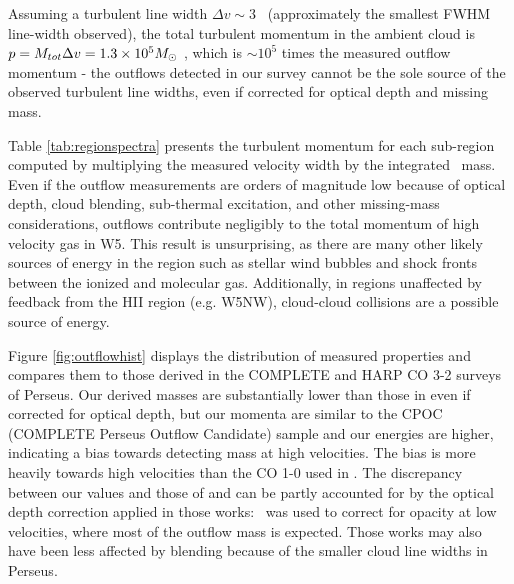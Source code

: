Assuming a turbulent line width $\Delta v \sim 3$ \kms\ (approximately the
smallest FWHM line-width observed), the total turbulent momentum in the ambient
cloud is $p = M_{tot} \Delta v = 1.3\times10^{5} M_{\odot}$ \kms, which is $\sim10^5$
times the measured outflow momentum - the outflows detected in our
survey cannot be the sole source of the observed turbulent line widths, even if
corrected for optical depth and missing mass.  

Table \ref{tab:regionspectra} presents the turbulent momentum for each
sub-region computed by multiplying the measured velocity width by the
integrated \thirteenco\ mass.  Even if the outflow measurements are 
orders of magnitude low because of optical depth, cloud blending, sub-thermal
excitation, and other missing-mass considerations, outflows contribute
negligibly to the total momentum of high velocity gas in W5.  This result is
unsurprising, as there are many other likely sources of energy in the region
such as stellar wind bubbles and shock fronts between the ionized and molecular
gas.  Additionally, in regions unaffected by feedback from the HII region (e.g.
W5NW), cloud-cloud collisions are a possible source of energy.

Figure \ref{fig:outflowhist} displays the distribution of measured properties
and compares them to those derived in the COMPLETE \citep{arce2010} and
\citet{curtis2010} HARP CO 3-2 surveys of Perseus.  Our derived masses are
substantially lower than those in \citet{arce2010} even if corrected for
optical depth, but our momenta are similar to the CPOC (COMPLETE Perseus
Outflow Candidate) sample and our energies are higher, indicating a bias
towards detecting mass at high velocities.  The bias is more heavily towards
high velocities than the CO 1-0 used in \citet{arce2010}.  The discrepancy
between our values and those of \citet{arce2010} and \citet{curtis2010} can be
partly accounted for by the optical depth correction applied in those works:
\thirteenco\ was used to correct for opacity at low velocities, where most of
the outflow mass is expected.  Those works may also have been less affected by
blending because of the smaller cloud line widths in Perseus.

